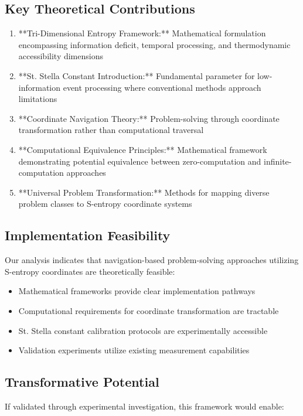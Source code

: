 \documentclass[12pt,a4paper]{article}
\begin{document}
\subsection{Key Theoretical Contributions}

\begin{enumerate}
\item **Tri-Dimensional Entropy Framework:** Mathematical formulation encompassing information deficit, temporal processing, and thermodynamic accessibility dimensions
\item **St. Stella Constant Introduction:** Fundamental parameter for low-information event processing where conventional methods approach limitations
\item **Coordinate Navigation Theory:** Problem-solving through coordinate transformation rather than computational traversal
\item **Computational Equivalence Principles:** Mathematical framework demonstrating potential equivalence between zero-computation and infinite-computation approaches
\item **Universal Problem Transformation:** Methods for mapping diverse problem classes to S-entropy coordinate systems
\end{enumerate}

\subsection{Implementation Feasibility}

Our analysis indicates that navigation-based problem-solving approaches utilizing S-entropy coordinates are theoretically feasible:

\begin{itemize}
\item Mathematical frameworks provide clear implementation pathways
\item Computational requirements for coordinate transformation are tractable
\item St. Stella constant calibration protocols are experimentally accessible
\item Validation experiments utilize existing measurement capabilities
\end{itemize}

\subsection{Transformative Potential}

If validated through experimental investigation, this framework would enable:
\end{document}
